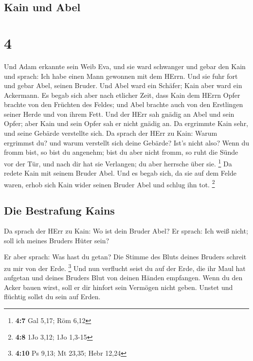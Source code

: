 \hypertarget{kain-und-abel}{%
\subsection{Kain und Abel}\label{kain-und-abel}}

\hypertarget{section-3}{%
\section{4}\label{section-3}}

 Und Adam erkannte sein Weib Eva, und sie ward schwanger
und gebar den Kain und sprach: Ich habe einen Mann gewonnen mit dem
HErrn.  Und sie fuhr fort und gebar Abel, seinen Bruder.
Und Abel ward ein Schäfer; Kain aber ward ein Ackermann. 
Es begab sich aber nach etlicher Zeit, dass Kain dem HErrn Opfer brachte
von den Früchten des Feldes;  und Abel brachte auch von
den Erstlingen seiner Herde und von ihrem Fett. Und der HErr sah gnädig
an Abel und sein Opfer;  aber Kain und sein Opfer sah er
nicht gnädig an. Da ergrimmte Kain sehr, und seine Gebärde verstellte
sich.  Da sprach der HErr zu Kain: Warum ergrimmst du? und
warum verstellt sich deine Gebärde?  Ist's nicht also?
Wenn du fromm bist, so bist du angenehm; bist du aber nicht fromm, so
ruht die Sünde vor der Tür, und nach dir hat sie Verlangen; du aber
herrsche über sie. \footnote{\textbf{4:7} Gal 5,17; Röm 6,12}
 Da redete Kain mit seinem Bruder Abel. Und es begab sich,
da sie auf dem Felde waren, erhob sich Kain wider seinen Bruder Abel und
schlug ihn tot. \footnote{\textbf{4:8} 1Jo 3,12; 1Jo 1,3-15}

\hypertarget{die-bestrafung-kains}{%
\subsection{Die Bestrafung Kains}\label{die-bestrafung-kains}}

 Da sprach der HErr zu Kain: Wo ist dein Bruder Abel? Er
sprach: Ich weiß nicht; soll ich meines Bruders Hüter sein?

 Er aber sprach: Was hast du getan? Die Stimme des Bluts
deines Bruders schreit zu mir von der Erde. \footnote{\textbf{4:10} Ps
  9,13; Mt 23,35; Hebr 12,24}  Und nun verflucht seist du
auf der Erde, die ihr Maul hat aufgetan und deines Bruders Blut von
deinen Händen empfangen.  Wenn du den Acker bauen wirst,
soll er dir hinfort sein Vermögen nicht geben. Unstet und flüchtig
sollst du sein auf Erden.

